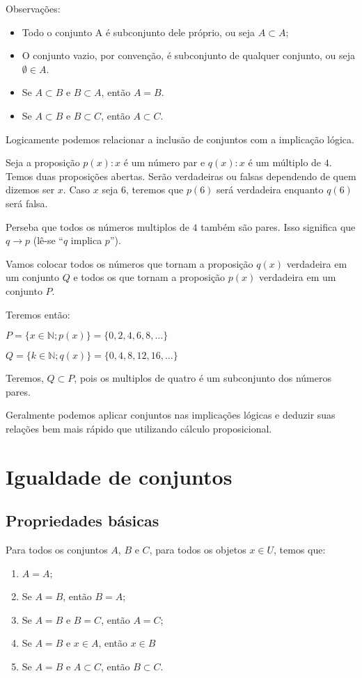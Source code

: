 Observações:
\begin{itemize}
\item Todo o conjunto A é subconjunto dele próprio, ou seja $A\subset A$;
\item O conjunto vazio, por convenção, é subconjunto de qualquer conjunto, ou seja $\emptyset \in A$.
\item Se $A \subset B$ e $B\subset A$, então $A=B$.
\item Se $A \subset B$ e $B \subset C$, então $A\subset C$.
\end{itemize}

Logicamente podemos relacionar a inclusão de conjuntos com a implicação lógica. 

Seja a proposição $p(x):x$ é um número par e $q(x):x$ é um múltiplo de $4$. Temos duas proposições abertas. Serão verdadeiras ou falsas dependendo de quem dizemos ser $x$. Caso $x$ seja $6$, teremos que $p(6)$ será verdadeira enquanto $q(6)$ será falsa.

Perseba que todos os números multiplos de $4$ também são pares. Isso significa que $q\rightarrow p$ (lê-se ``$q$ implica $p$'').

Vamos colocar todos os números que tornam a proposição $q(x)$ verdadeira em um conjunto $Q$ e todos os que tornam a proposição $p(x)$ verdadeira em um conjunto $P$.

Teremos então:

$P=\{x\in \mathbb{N}; p(x)\}=\{0, 2, 4, 6, 8, \dots\}$

$Q=\{k\in \mathbb{N}; q(x)\}=\{0,4,8,12,16, \dots\}$

Teremos, $Q \subset P$, pois os multiplos de quatro é um subconjunto dos números pares.

Geralmente podemos aplicar conjuntos nas implicações lógicas e deduzir suas relações bem mais rápido que utilizando cálculo proposicional.

\section{Igualdade de conjuntos}

\subsection{Propriedades básicas}
Para todos os conjuntos $A$, $B$ e $C$, para todos os objetos $x\in U$, temos que:
\begin{enumerate}
    \item $A=A$;
    \item Se $A=B$, então $B=A$;
    \item Se $A=B$ e $B=C$, então $A=C$;
    \item Se $A=B$ e $x\in A$, então $x\in B$
    \item Se $A=B$ e $A\subset C$, então $B \subset C$.
\end{enumerate}

